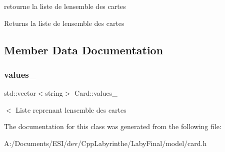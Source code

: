 retourne la liste de l\textquotesingle{}ensemble des cartes \begin{DoxyReturn}{Returns}
la liste de l\textquotesingle{}ensemble des cartes 
\end{DoxyReturn}


\subsection{Member Data Documentation}
\mbox{\label{class_card_a12441d0811ac375535606c4cb626cd21}} 
\subsubsection{\texorpdfstring{values\_}{values\_}}
{\footnotesize\ttfamily std\+::vector$<$string$>$ Card\+::values\+\_\+\hspace{0.3cm}{\ttfamily [private]}}

$<$ Liste reprenant l\textquotesingle{}ensemble des cartes 

The documentation for this class was generated from the following file\+:\begin{DoxyCompactItemize}
\item 
A\+:/\+Documents/\+E\+S\+I/dev/\+Cpp\+Labyrinthe/\+Laby\+Final/model/card.\+h\end{DoxyCompactItemize}

